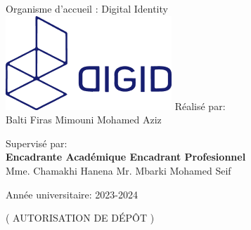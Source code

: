 \begin{center}
Organisme d'accueil : Digital Identity 
\\
\vskip 1cm
\includegraphics[width=0.19 \columnwidth]{chap1.images/digidlogo.png}
\vskip 1cm
Réalisé par:
\\  Balti Firas \hfill  Mimouni Mohamed Aziz   \\
\vskip 1cm

Supervisé par: \\
\textbf{Encadrante Académique   \hfill   Encadrant Profesionnel   }
\\ Mme. Chamakhi Hanena  \hfill     Mr. Mbarki Mohamed Seif  \\
                         
\end{center}

\vfill
\begin{center}


\vskip 0.75cm
    \footnotesize{Année universitaire: 2023-2024}
     \\

\end{center}

\newpage
   ( AUTORISATION DE DÉPÔT ) 

\begin{figure}[p]
    \centering
\end{figure}

\newpage
\begin{figure}[p]
    \centering
\end{figure}

\newpage


